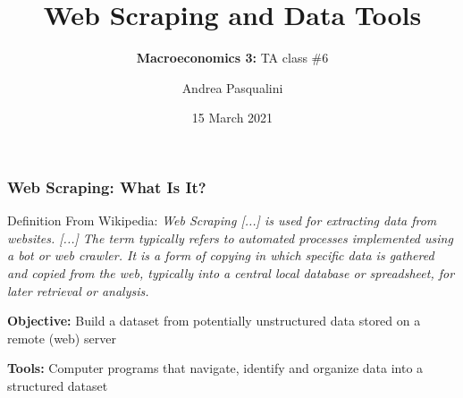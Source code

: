 \documentclass[10pt, aspectratio=1610, natbib, handout]{beamer}
\title[Web Scraping]{
  \textbf{Web Scraping and Data Tools}
}
\subtitle[Macro 3: TA\#6]{
  \textbf{Macroeconomics 3:} TA class \#6
}
\author[A.~Pasqualini]{
  Andrea Pasqualini
}
\institute[Bocconi]{Bocconi University}
\date{
  15 March 2021
}
\begin{document}
  \begin{frame}
    \maketitle
  \end{frame}

  \begin{frame}
    \frametitle{Web Scraping: What Is It?}

    \begin{block}{Definition}
      From Wikipedia:
      \textit{
        Web Scraping [...] is used for extracting data from websites. [...]
        The term typically refers to automated processes implemented using a bot or web crawler.
        It is a form of copying in which specific data is gathered and copied from the web, typically into a central local database or spreadsheet, for later retrieval or analysis.
      }
    \end{block}

    \vfill\pause

    \textbf{Objective:}
    Build a dataset from potentially unstructured data stored on a remote (web) server

    \textbf{Tools:}
    Computer programs that navigate, identify and organize data into a structured dataset

  \end{frame}
\end{document}
